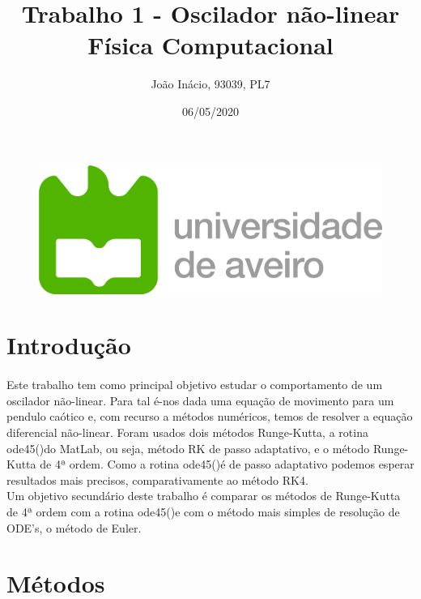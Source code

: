 \documentclass[a4paper, 11pt]{article}
\newcommand{\ode}{{\fontfamily{pcr}\selectfont ode45()}}
\begin{document}
	
	\begin{figure}[t]
		\includegraphics[scale=0.25]{Logo_UA}
	\end{figure}
	
	\title{Trabalho 1 - Oscilador não-linear \\ 
		   \Large Física Computacional}
	\author{João Inácio, 93039, PL7}
	\date{06/05/2020}
	\maketitle
	
	\section{Introdução}
	
	\paragraph{}
	Este trabalho tem como principal objetivo estudar o comportamento de um oscilador não-linear. Para tal é-nos dada uma equação de movimento para um pendulo caótico e, com recurso a métodos numéricos, temos de resolver a equação diferencial não-linear. Foram usados dois métodos Runge-Kutta, a rotina \ode do MatLab, ou seja, método RK de passo adaptativo, e o método Runge-Kutta de 4ª ordem. Como a rotina \ode é de passo adaptativo podemos esperar resultados mais precisos, comparativamente ao método RK4.\\
	Um objetivo secundário deste trabalho é comparar os métodos de Runge-Kutta de 4ª ordem com a rotina \ode e com o método mais simples de resolução de ODE's, o método de Euler.
	\section{Métodos}
\end{document}
